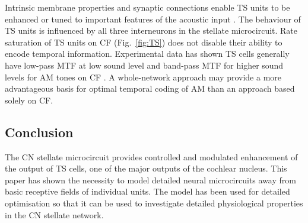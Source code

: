 Intrinsic membrane properties and synaptic connections enable TS
units to be enhanced or tuned to important features of the acoustic
input \cite{PaoliniClareyEtAl:2005}. The behaviour of TS units is
influenced by all three interneurons in the stellate
microcircuit. Rate saturation of TS units on CF (Fig.~\ref{fig:TS})
does not disable their ability to encode temporal information.
Experimental data has shown TS cells generally have low-pass MTF at
low sound level and band-pass MTF for higher sound levels for AM
tones on CF \cite{RhodeGreenberg:1994}. A whole-network approach
may provide a more advantageous basis for optimal temporal coding
of AM than an approach based solely on CF.



\subsection{Conclusion}

The CN stellate microcircuit provides controlled and modulated
enhancement of the output of TS cells, one of the major outputs of
the cochlear nucleus.  This paper has shown the necessity to model
detailed neural microcircuits away from basic receptive fields of
individual units.  The model has been used for detailed
optimisation \cite{EagerGraydenEtAl:2006,EagerGraydenEtAl:2006a} so
that it can be used to investigate detailed physiological
properties in the CN stellate network.






